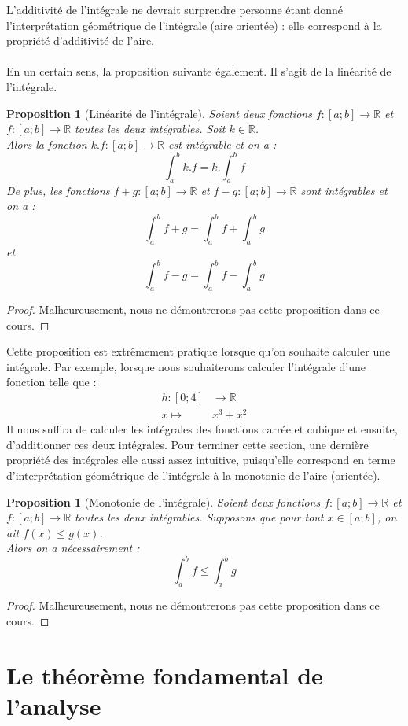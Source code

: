\documentclass[a4paper,fontsize=13pt]{scrreprt}
\theoremstyle{plain}
\newtheorem{pro}[subsection]{Proposition}
\theoremstyle{definition}
\newcommand{\rr}{\mathbb{R}}
\begin{document}
L'additivité de l'intégrale ne devrait surprendre personne étant donné l'interprétation géométrique de l'intégrale (aire orientée) : elle correspond à la propriété d'additivité de l'aire. \\
~\\
En un certain sens, la proposition suivante également. Il s'agit de la linéarité de l'intégrale.
\begin{pro} [Linéarité de l'intégrale]
Soient deux fonctions $f : [a;b] \to \rr$ et $f : [a;b] \to \rr$ toutes les deux intégrables. Soit $k \in \rr$. \\
Alors la fonction $k.f : [a;b] \to \rr$ est intégrable et on a :
$$\int_{a}^{b} k.f = k.\int_{a}^{b} f$$
De plus, les fonctions $f+g : [a;b] \to \rr$ et $f-g : [a;b] \to \rr$ sont intégrables et on a :
$$\int_{a}^{b} f+g = \int_{a}^{b} f + \int_{a}^{b} g$$
et
$$\int_{a}^{b} f-g = \int_{a}^{b} f - \int_{a}^{b} g$$
\end{pro}
\begin{proof}
Malheureusement, nous ne démontrerons pas cette proposition dans ce cours.
\end{proof}
Cette proposition est extrêmement pratique lorsque qu'on souhaite calculer une intégrale. Par exemple, lorsque nous souhaiterons calculer l'intégrale d'une fonction telle que :
\begin{align*}
h : [0;4]& \to \rr \\
x \mapsto & x^3 + x^2
\end{align*}
Il nous suffira de calculer les intégrales des fonctions carrée et cubique et ensuite, d'additionner ces deux intégrales. \newpage
Pour terminer cette section, une dernière propriété des intégrales elle aussi assez intuitive, puisqu'elle correspond en terme d'interprétation géométrique de l'intégrale à la monotonie de l'aire (orientée).
\begin{pro} [Monotonie de l'intégrale]
Soient deux fonctions $f : [a;b] \to \rr$ et $f : [a;b] \to \rr$ toutes les deux intégrables. Supposons que pour tout $x \in [a;b]$, on ait $f(x) \le g(x)$. \\
Alors on a nécessairement :
$$\int_{a}^{b} f \le \int_{a}^{b} g$$
\end{pro}
\begin{proof}
Malheureusement, nous ne démontrerons pas cette proposition dans ce cours.
\end{proof}

\chapter{Le théorème fondamental de l'analyse} \label{tf}
\end{document}
